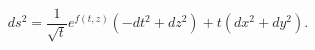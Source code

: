 \begin{equation}
  \label{eq:plane}
  ds^2=\frac{1}{\sqrt{t}} e^{f(t,z)} (-dt^2+dz^2)+t(dx^2+dy^2) .
\end{equation}

